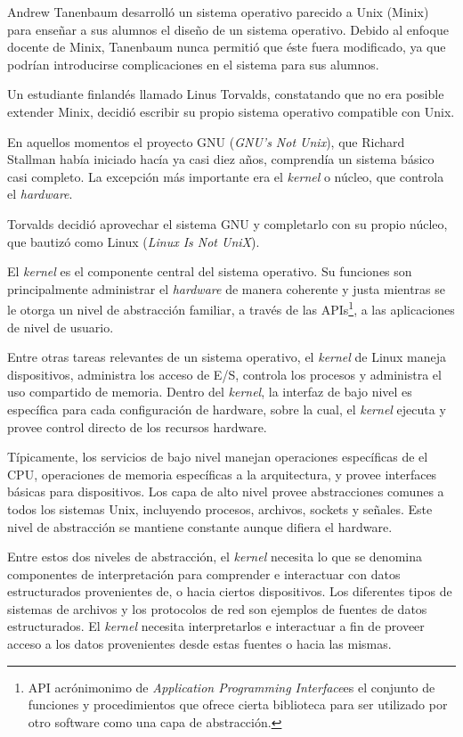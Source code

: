 Andrew Tanenbaum desarrolló un sistema operativo parecido a Unix (Minix)
para enseñar a sus alumnos el diseño de un sistema operativo. Debido al enfoque
docente de Minix, Tanenbaum nunca permitió que éste fuera modificado, ya que
podrían introducirse complicaciones en el sistema para sus alumnos.

Un estudiante finlandés llamado Linus Torvalds, constatando que no era posible
extender Minix, decidió escribir su propio sistema operativo compatible con
Unix.

En aquellos momentos el proyecto GNU (\emph{GNU's Not Unix}), que Richard
Stallman había iniciado hacía ya casi diez años, comprendía un sistema básico
casi completo. La excepción más importante era el \emph{kernel} o núcleo, que
controla el \emph{hardware}.

Torvalds decidió aprovechar el sistema GNU y completarlo con su propio núcleo,
que bautizó como Linux (\emph{Linux Is Not UniX}).

El \emph{kernel} es el componente central del sistema operativo. Su funciones
son principalmente administrar el \emph{hardware} de manera coherente y justa
mientras se le otorga un nivel de abstracción familiar, a través de las
APIs\footnote{ API acrónimonimo de \emph{Application Programming Interface}es el
conjunto de funciones y procedimientos que ofrece cierta biblioteca para ser
utilizado por otro software como una capa de abstracción.}, a las
aplicaciones de nivel de usuario.

Entre otras tareas relevantes de un sistema operativo, el \emph{kernel} de Linux
maneja dispositivos, administra los acceso de E/S, controla los procesos y
administra el uso compartido de memoria. Dentro del \emph{kernel}, la interfaz
de bajo nivel es específica para cada configuración de hardware, sobre la cual,
el \emph{kernel} ejecuta y provee control directo de los recursos hardware.

Típicamente, los servicios de bajo nivel manejan operaciones específicas de el
CPU, operaciones de memoria específicas a la arquitectura, y provee interfaces
básicas para dispositivos. Los capa de alto nivel provee abstracciones comunes a
todos los sistemas Unix, incluyendo procesos, archivos, sockets y señales. Este
nivel de abstracción se mantiene constante aunque difiera el hardware.

Entre estos dos niveles de abstracción, el \emph{kernel} necesita lo que se
denomina componentes de interpretación para comprender e interactuar con datos
estructurados provenientes de, o hacia ciertos dispositivos. Los diferentes
tipos de sistemas de archivos y los protocolos de red son ejemplos de fuentes de
datos estructurados. El \emph{kernel} necesita interpretarlos e interactuar a
fin de proveer acceso a los datos provenientes desde estas fuentes o hacia las
mismas.

